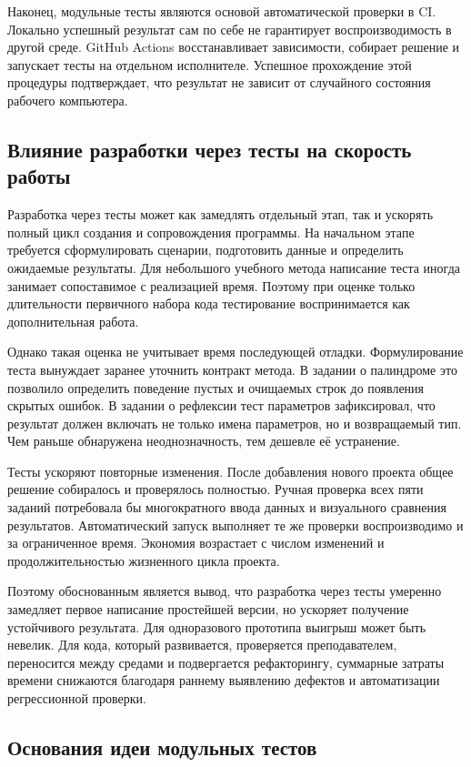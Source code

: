 Наконец, модульные тесты являются основой автоматической проверки в CI. Локально успешный результат сам по себе не гарантирует воспроизводимость в другой среде. GitHub Actions восстанавливает зависимости, собирает решение и запускает тесты на отдельном исполнителе. Успешное прохождение этой процедуры подтверждает, что результат не зависит от случайного состояния рабочего компьютера.

\subsection{Влияние разработки через тесты на скорость работы}

Разработка через тесты может как замедлять отдельный этап, так и ускорять полный цикл создания и сопровождения программы. На начальном этапе требуется сформулировать сценарии, подготовить данные и определить ожидаемые результаты. Для небольшого учебного метода написание теста иногда занимает сопоставимое с реализацией время. Поэтому при оценке только длительности первичного набора кода тестирование воспринимается как дополнительная работа.

Однако такая оценка не учитывает время последующей отладки. Формулирование теста вынуждает заранее уточнить контракт метода. В задании о палиндроме это позволило определить поведение пустых и очищаемых строк до появления скрытых ошибок. В задании о рефлексии тест параметров зафиксировал, что результат должен включать не только имена параметров, но и возвращаемый тип. Чем раньше обнаружена неоднозначность, тем дешевле её устранение.

Тесты ускоряют повторные изменения. После добавления нового проекта общее решение собиралось и проверялось полностью. Ручная проверка всех пяти заданий потребовала бы многократного ввода данных и визуального сравнения результатов. Автоматический запуск выполняет те же проверки воспроизводимо и за ограниченное время. Экономия возрастает с числом изменений и продолжительностью жизненного цикла проекта.

Поэтому обоснованным является вывод, что разработка через тесты умеренно замедляет первое написание простейшей версии, но ускоряет получение устойчивого результата. Для одноразового прототипа выигрыш может быть невелик. Для кода, который развивается, проверяется преподавателем, переносится между средами и подвергается рефакторингу, суммарные затраты времени снижаются благодаря раннему выявлению дефектов и автоматизации регрессионной проверки.

\subsection{Основания идеи модульных тестов}

